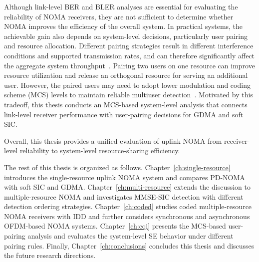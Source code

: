 Although link-level BER and BLER analyses are essential for evaluating the reliability of NOMA receivers, they are not sufficient to determine whether NOMA improves the efficiency of the overall system. 
In practical systems, the achievable gain also depends on system-level decisions, particularly user pairing and resource allocation. Different pairing strategies result in different interference conditions and supported transmission rates, and can therefore significantly affect the aggregate system throughput~\cite{ali2016dynamic,sedaghat2018user}. 
Pairing two users on one resource can improve resource utilization and release an orthogonal resource for serving an additional user. However, the paired users may need to adopt lower modulation and coding scheme (MCS) levels to maintain reliable multiuser detection~\cite{marcano2017novel}. 
Motivated by this tradeoff, this thesis conducts an MCS-based system-level analysis that connects link-level receiver performance with user-pairing decisions for GDMA and soft SIC.

Overall, this thesis provides a unified evaluation of uplink NOMA from receiver-level reliability to system-level resource-sharing efficiency.

The rest of this thesis is organized as follows. Chapter~\ref{ch:single-resource} introduces the single-resource uplink NOMA system and compares PD-NOMA with soft SIC and GDMA. 
Chapter~\ref{ch:multi-resource} extends the discussion to multiple-resource NOMA and investigates MMSE-SIC detection with different detection ordering strategies. 
Chapter~\ref{ch:coded} studies coded multiple-resource NOMA receivers with IDD and further considers synchronous and asynchronous OFDM-based NOMA systems. 
Chapter~\ref{ch:cqi} presents the MCS-based user-pairing analysis and evaluates the system-level SE behavior under different pairing rules. 
Finally, Chapter~\ref{ch:conclusions} concludes this thesis and discusses the future research directions.


